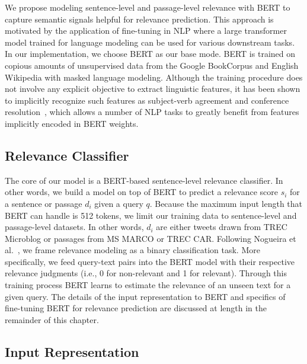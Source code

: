 We propose modeling sentence-level and passage-level relevance with BERT to capture semantic signals helpful for relevance prediction.
This approach is motivated by the application of fine-tuning in NLP where a large transformer model trained for language modeling can be used for various downstream tasks.
In our implementation, we choose BERT as our base mode.
BERT is trained on copious amounts of unsupervised data from the Google BookCorpus and English Wikipedia with masked language modeling.
Although the training procedure does not involve any explicit objective to extract linguistic features, it has been shown to implicitly recognize such features as subject-verb agreement and conference resolution~\cite{jawahar2019does, clark2019does}, which allows a number of NLP tasks to greatly benefit from features implicitly encoded in BERT weights.

\subsection{Relevance Classifier}

The core of our model is a BERT-based sentence-level relevance classifier.
In other words, we build a model on top of BERT to predict a relevance score $ s_i $ for a sentence or passage $ d_i $ given a query $ q $.
Because the maximum input length that BERT can handle is 512 tokens, we limit our training data to sentence-level and passage-level datasets.
In other words, $ d_i $ are either tweets drawn from TREC Microblog or passages from MS MARCO or TREC CAR.
Following Nogueira et al.~\cite{nogueira2019passage}, we frame relevance modeling as a binary classification task.
More specifically, we feed query-text pairs into the BERT model with their respective relevance judgments (i.e., 0 for non-relevant and 1 for relevant).
Through this training process BERT learns to estimate the relevance of an unseen text for a given query.
The details of the input representation to BERT and specifics of fine-tuning BERT for relevance prediction are discussed at length in the remainder of this chapter.

\subsection{Input Representation}

